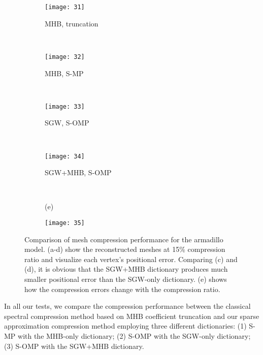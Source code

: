 \begin{figure}
    \centering
    \begin{subfigure}{0.44\linewidth}
        \texttt{[image: 31]}
        \caption{MHB, truncation}
    \end{subfigure}
    ~
    \begin{subfigure}{0.44\linewidth}
        \texttt{[image: 32]}
        \caption{MHB, S-MP}
    \end{subfigure}
    \\
    \begin{subfigure}{0.44\linewidth}
        \texttt{[image: 33]}
        \caption{SGW, S-OMP}
    \end{subfigure}
    ~
    \begin{subfigure}{0.44\linewidth}
        \texttt{[image: 34]}
        \caption{SGW+MHB, S-OMP}
    \end{subfigure}
    \\
    \begin{subfigure}{0.05\linewidth}
        (e)
    \end{subfigure}
    \begin{subfigure}{0.83\linewidth}
        \texttt{[image: 35]}
    \end{subfigure}
    \caption[Mesh compression performance on the armadillo model.]
    {Comparison of mesh compression performance
        for the armadillo model. (a-d) show the reconstructed meshes
        at 15\% compression ratio and visualize each vertex's
        positional error. Comparing (c) and (d), it is obvious that the SGW+MHB dictionary
        produces much smaller positional error than the SGW-only dictionary.
        (e) shows how the compression errors change with the compression
        ratio.}
    \label{fig:armadilloeval}
\end{figure}

In all our tests, we compare the compression performance between the
classical spectral compression method based on MHB coefficient
truncation \cite{Karni2000} and our sparse approximation
compression method employing three different dictionaries: (1) S-MP
with the MHB-only dictionary; (2) S-OMP with the SGW-only dictionary;
(3) S-OMP with the SGW+MHB dictionary.

